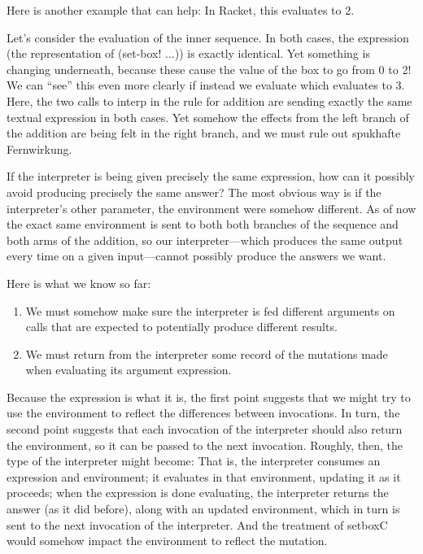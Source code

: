 
Here is another example that can help:
In Racket, this evaluates to 2.


Let’s consider the evaluation of the inner sequence. In both cases, the
expression (the representation of (set-box! ...)) is exactly identical. Yet
something is changing underneath, because these cause the value of the box to go
from 0 to 2! We can “see” this even more clearly if instead we evaluate
which evaluates to 3. Here, the two calls to interp in the rule for addition are
sending exactly the same textual expression in both cases. Yet somehow the
effects from the left branch of the addition are being felt in the right branch,
and we must rule out spukhafte Fernwirkung.

If the interpreter is being given precisely the same expression, how can it
possibly avoid producing precisely the same answer? The most obvious way is if
the interpreter’s other parameter, the environment were somehow different. As of
now the exact same environment is sent to both both branches of the sequence and
both arms of the addition, so our interpreter—which produces the same output
every time on a given input—cannot possibly produce the answers we want.

Here is what we know so far:
\begin{enumerate}[nosep]
  \item 
We must somehow make sure the interpreter is fed different arguments on calls
that are expected to potentially produce different results.
  \item 
We must return from the interpreter some record of the mutations made when
evaluating its argument expression.
\end{enumerate}

Because the expression is what it is, the first point suggests that we might try
to use the environment to reflect the differences between invocations. In turn,
the second point suggests that each invocation of the interpreter should also
return the environment, so it can be passed to the next invocation. Roughly,
then, the type of the interpreter might become:
That is, the interpreter consumes an expression and environment; it evaluates in
that environment, updating it as it proceeds; when the expression is done
evaluating, the interpreter returns the answer (as it did before), along with an
updated environment, which in turn is sent to the next invocation of the
interpreter. And the treatment of setboxC would somehow impact the environment
to reflect the mutation.

